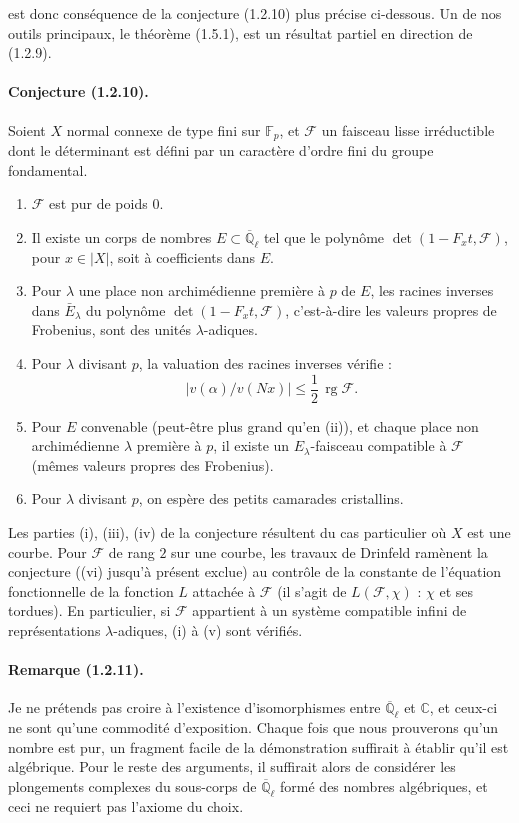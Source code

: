 \documentclass[11pt]{article}
\theoremstyle{remark}
\newcommand{\Qlb}{\overline{\mathbb{Q}}_\ell}
\newcommand{\CC}{\mathbb{C}}
\newcommand{\Fp}{\mathbb{F}_p}
\newcommand{\rg}{\operatorname{rg}}
\begin{document}
est donc conséquence de la conjecture (1.2.10) plus précise ci-dessous. Un de nos outils principaux, le théorème (1.5.1), est un résultat partiel en direction de (1.2.9).

\paragraph{Conjecture (1.2.10).} Soient $X$ normal connexe de type fini sur $\Fp$, et $\mathcal F$ un faisceau lisse irréductible dont le déterminant est défini par un caractère d'ordre fini du groupe fondamental.
\begin{enumerate}[label=(\roman*)]
\item $\mathcal F$ est pur de poids $0$.
\item Il existe un corps de nombres $E\subset\Qlb$ tel que le polynôme $\det(1-F_x t,\mathcal F)$, pour $x\in |X|$, soit à coefficients dans $E$.
\item Pour $\lambda$ une place non archimédienne première à $p$ de $E$, les racines inverses dans $\bar E_\lambda$ du polynôme $\det(1-F_x t,\mathcal F)$, c'est-à-dire les valeurs propres de Frobenius, sont des unités $\lambda$-adiques.
\item Pour $\lambda$ divisant $p$, la valuation des racines inverses vérifie :
\[
|v(\alpha)/v(Nx)|\le \frac12\,\rg \mathcal F.
\]
\item Pour $E$ convenable (peut-être plus grand qu'en (ii)), et chaque place non archimédienne $\lambda$ première à $p$, il existe un $E_\lambda$-faisceau compatible à $\mathcal F$ (mêmes valeurs propres des Frobenius).
\item Pour $\lambda$ divisant $p$, on espère des petits camarades cristallins.
\end{enumerate}

Les parties (i), (iii), (iv) de la conjecture résultent du cas particulier où $X$ est une courbe. Pour $\mathcal F$ de rang $2$ sur une courbe, les travaux de Drinfeld ramènent la conjecture ((vi) jusqu'à présent exclue) au contrôle de la constante de l'équation fonctionnelle de la fonction $L$ attachée à $\mathcal F$ (il s'agit de $L(\mathcal F,\chi)$ : $\chi$ et ses tordues). En particulier, si $\mathcal F$ appartient à un système compatible infini de représentations $\lambda$-adiques, (i) à (v) sont vérifiés.

\paragraph{Remarque (1.2.11).} Je ne prétends pas croire à l'existence d'isomorphismes entre $\Qlb$ et $\CC$, et ceux-ci ne sont qu'une commodité d'exposition. Chaque fois que nous prouverons qu'un nombre est pur, un fragment facile de la démonstration suffirait à établir qu'il est algébrique. Pour le reste des arguments, il suffirait alors de considérer les plongements complexes du sous-corps de $\Qlb$ formé des nombres algébriques, et ceci ne requiert pas l'axiome du choix.
\end{document}
